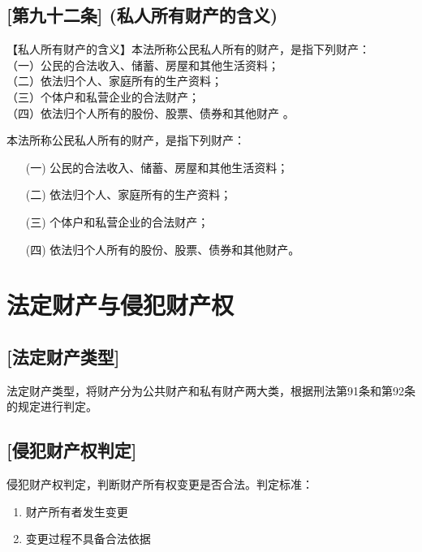\subsection{[第九十二条] (私人所有财产的含义)}

【私人所有财产的含义】本法所称公民私人所有的财产，是指下列财产：\\
（一）公民的合法收入、储蓄、房屋和其他生活资料；\\
（二）依法归个人、家庭所有的生产资料；\\
（三）个体户和私营企业的合法财产；\\
（四）依法归个人所有的股份、股票、债券和其他财产 。

\begin{definition}\label{isPrivateProperty}
\leanok
{}
本法所称公民私人所有的财产，是指下列财产：
\begin{enumerate}
\item[(一)] 公民的合法收入、储蓄、房屋和其他生活资料；
\item[(二)] 依法归个人、家庭所有的生产资料；
\item[(三)] 个体户和私营企业的合法财产；
\item[(四)] 依法归个人所有的股份、股票、债券和其他财产。
\end{enumerate}
\end{definition}

\section{法定财产与侵犯财产权}

\subsection{[法定财产类型]}

\begin{definition}\label{LegalProperty}
\leanok
{}
法定财产类型，将财产分为公共财产和私有财产两大类，根据刑法第91条和第92条的规定进行判定。
\end{definition}

\subsection{[侵犯财产权判定]}

\begin{definition}\label{isPropertyRightsViolation}
\leanok
{}
侵犯财产权判定，判断财产所有权变更是否合法。判定标准：
\begin{enumerate}
\item 财产所有者发生变更
\item 变更过程不具备合法依据
\end{enumerate}
\end{definition}
